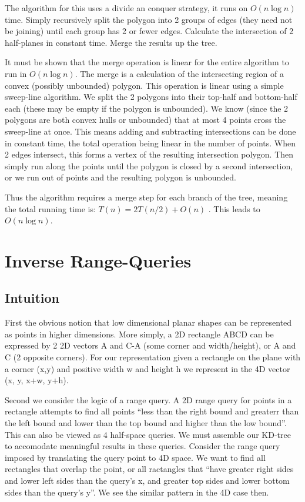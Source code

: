 The algorithm for this uses a divide an conquer strategy, it runs on $O(n \log n)$ time.
Simply recursively split the polygon into 2 groups of edges (they need not be joining) until each group has 2 or fewer edges.
Calculate the intersection of 2 half-planes in constant time.
Merge the results up the tree.

It must be shown that the merge operation is linear for the entire algorithm to run in $O(n \log n)$.
The merge is a calculation of the intersecting region of a convex (possibly unbounded) polygon.
This operation is linear using a simple sweep-line algorithm.
We split the 2 polygons into their top-half and bottom-half each (these may be empty if the polygon is unbounded).
We know (since the 2 polygons are both convex hulls or unbounded) that at most 4 points cross the sweep-line at once.
This means adding and subtracting intersections can be done in constant time, the total operation being linear in the number of points.
When 2 edges intersect, this forms a vertex of the resulting intersection polygon.
Then simply run along the points until the polygon is closed by a second intersection, or we run out of points and the resulting polygon is unbounded.

Thus the algorithm requires a merge step for each branch of the tree, meaning the total running time is: $T(n) = 2T(n/2) + O(n)$ \cite{hpi}.
This leads to $O(n \log n)$.

\section {Inverse Range-Queries}

\subsection{Intuition}

First the obvious notion that low dimensional planar shapes can be represented as points in higher dimensions.
More simply, a 2D rectangle ABCD can be expressed by 2 2D vectors A and C-A (some corner and width/height), or A and C (2 opposite corners).
For our representation given a rectangle on the plane with a corner (x,y) and positive width w and height h we represent in the 4D vector (x, y, x+w, y+h).

Second we consider the logic of a range query.
A 2D range query for points in a rectangle attempts to find all points ``less than the right bound and greaterr than the left bound and lower than the top bound and higher than the low bound''.
This can also be viewed as 4 half-space queries.
We must assemble our KD-tree to accomodate meaningful results in these queries.
Consider the range query imposed by translating the query point to 4D space.
We want to find all rectangles that overlap the point, or all ractangles that ``have greater right sides and lower left sides than the query's x, and greater top sides and lower bottom sides than the query's y''.
We see the similar pattern in the 4D case then.

